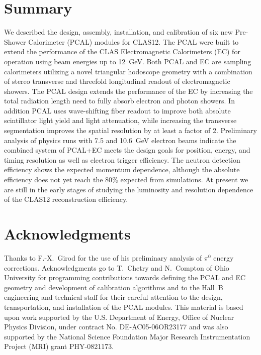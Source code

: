 \section{Summary}

We described the design, assembly, installation, and calibration of six new Pre-Shower Calorimeter (PCAL) modules
for CLAS12. The PCAL were built to extend the performance of the CLAS Electromagnetic Calorimeters (EC) for
operation using beam energies up to 12~GeV. Both PCAL and EC are sampling calorimeters utilizing a novel triangular
hodoscope geometry with a combination of stereo transverse and threefold longitudinal readout of electromagnetic
showers. The PCAL design extends the performance of the EC by increasing the total radiation length need to fully
absorb electron and photon showers.  In addition PCAL uses wave-shifting fiber readout to improve both absolute
scintillator light yield and light attenuation, while increasing the transverse segmentation improves the spatial
resolution by at least a factor of 2. Preliminary analysis of physics runs with 7.5 and 10.6~GeV electron beams
indicate the combined system of PCAL+EC meets the design goals for position, energy, and timing resolution as well
as electron trigger efficiency. The neutron detection efficiency shows the expected momentum dependence, although
the absolute efficiency does not yet reach the 80$\%$ expected from simulations. At present we are still in the early
stages of studying the luminosity and resolution dependence of the CLAS12 reconstruction efficiency.

\section*{Acknowledgments}

Thanks to F.-X.~Girod for the use of his preliminary analysis of $\pi^0$ energy corrections. Acknowledgments go to
T.~Chetry and N.~Compton of Ohio University for programming contributions towards defining the PCAL and EC
geometry and development of  calibration algorithms and to the Hall~B engineering and technical staff for their
careful attention to the design, transportation, and installation of the PCAL modules. This material is based upon
work supported by the U.S. Department of Energy, Office of Nuclear Physics Division, under contract No.
DE-AC05-06OR23177 and was also supported by the National Science Foundation Major Research Instrumentation
Project (MRI) grant PHY-0821173.





